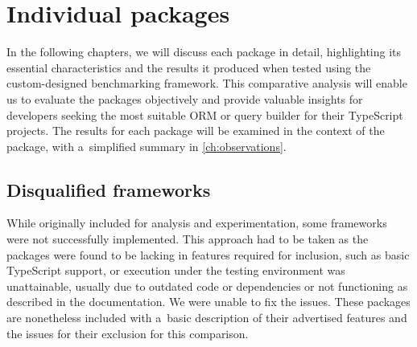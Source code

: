 \chapter{Individual packages}\label{ch:Packages}

In the following chapters, we will discuss each package in detail, highlighting
its essential characteristics and the results it produced when tested using the
custom-designed benchmarking framework. This comparative analysis will enable us
to evaluate the packages objectively and provide valuable insights for
developers seeking the most suitable ORM or query builder for their TypeScript
projects. The results for each package will be examined in the context of the
package, with a~simplified summary in \autoref{ch:observations}.











\section{Disqualified frameworks}
\label{sec:disqualified}

While originally included for analysis and experimentation, some frameworks were
not successfully implemented. This approach had to be taken as the packages were
found to be lacking in features required for inclusion, such as basic TypeScript
support, or execution under the testing environment was unattainable, usually
due to outdated code or dependencies or not functioning as described in the
documentation. We were unable to fix the issues. These packages are nonetheless
included with a~basic description of their advertised features and the issues
for their exclusion for this comparison.



